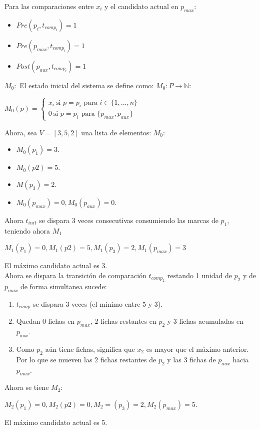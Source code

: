 Para las comparaciones entre $x_i$ y el candidato actual en $p_{max}:$
\begin{itemize}
    \item $Pre(p_i,t_{comp_i})=1$
    \item $Pre(p_{max}, t_{comp_i})=1$
    \item $Post(p_{aux},t_{comp_i})=1$
\end{itemize}
$M_0:$
El estado inicial del sistema se define como: $M_0:P\to \mathbb{N}:$
\begin{center}
    $M_0(p)= \begin{cases}
        x_i\ \text{si }p=p_i \text{ para } i\in \{ 1,...,n \}\\
        0 \ \text{si }p=p_i \text{ para } \{ p_{max},p_{aux}\}
        \end{cases}$
\end{center}
Ahora, sea $V=[3,5,2]$ una lista de elementos:
$M_0:$
\begin{itemize}
    \item $M_0(p_1) =3.$
    \item $M_0(p2)=5.$
    \item $M(p_3)=2.$
    \item $M_0(p_{max})=0, M_0(p_{aux})=0.$
\end{itemize}
Ahora $t_{init}$ se dispara 3 veces consecutivas consumiendo las marcas de $p_1$, teniendo ahora $M_1$\begin{center}
$M_1(p_1)=0, M_1(p2)=5, M_1(p_3)=2, M_1(p_{max})=3$ 
\end{center}
El máximo candidato actual es 3. \\
Ahora se dispara la  transición de comparación $t_{comp_2}$ restando 1 unidad de $p_2$ y de $p_{max}$ de forma simultanea sucede:
\begin{enumerate}
    \item $t_{comp}$ se dispara 3 veces (el mínimo entre 5 y 3).
    \item Quedan 0 fichas en $p_{max}$, 2 fichas restantes en $p_2$ y 3 fichas acumuladas en $p_{aux}$.
    \item Como $p_2$ aún tiene fichas, significa que $x_2$ es mayor que el máximo anterior. Por lo que se mueven las 2 fichas restantes de $p_2$ y las 3 fichas de $p_{aux}$ hacia $p_{max}$.
\end{enumerate}
Ahora se tiene $M_2:$
\begin{center}
$M_2(p_1)=0, M_2(p2)=0, M_2=(p_3)=2, M_2(p_{max})=5$.    
\end{center}
El máximo candidato actual es 5.\\
